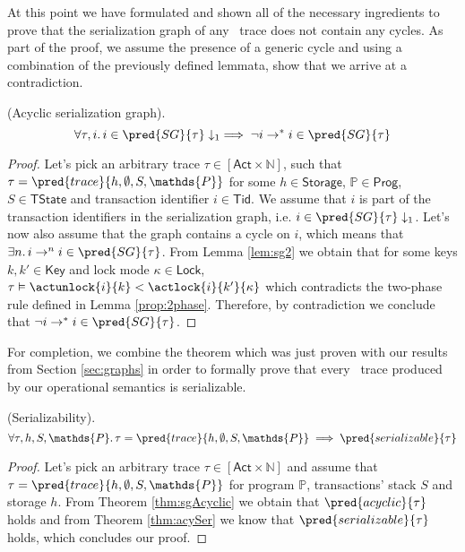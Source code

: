 At this point we have formulated and shown all of the necessary ingredients to prove that the serialization graph of any \tpl\ trace does not contain any cycles. As part of the proof, we assume the presence of a generic cycle and using a combination of the previously defined lemmata, show that we arrive at a contradiction.
\begin{thm}
	\label{thm:sgAcyclic}
	(Acyclic serialization graph).
	\[
	\forall \tau, i \ldotp i \in \pred{SG}{\tau} \downarrow_1 \implies \lnot i \rightarrow^* i \in \pred{SG}{\tau}
	\]
	\begin{proof}
	Let's pick an arbitrary trace $\tau \in [\mathsf{Act} \times \mathds{N}]$, such that $\tau = \pred{trace}{h, \emptyset, S, \mathds{P}}$ for some $h \in \mathsf{Storage}$, $\mathds{P} \in \mathsf{Prog}$, $S \in \mathsf{TState}$ and transaction identifier $i \in \mathsf{Tid}$. We assume that $i$ is part of the transaction identifiers in the serialization graph, i.e. $i \in \pred{SG}{\tau} \downarrow_1$. Let's now also assume that the graph contains a cycle on $i$, which means that $\exists n \ldotp i \rightarrow^n i \in \pred{SG}{\tau}$. From Lemma \ref{lem:sg2} we obtain that for some keys $k, k' \in \mathsf{Key}$ and lock mode $\kappa \in \mathsf{Lock}$, $\tau \vDash \actunlock{i}{k} < \actlock{i}{k'}{\kappa}$ which contradicts the two-phase rule defined in Lemma \ref{prop:2phase}. Therefore, by contradiction we conclude that $\lnot i \rightarrow^* i \in \pred{SG}{\tau}$.
	\end{proof}
\end{thm}

For completion, we combine the theorem which was just proven with our results from Section \ref{sec:graphs} in order to formally prove that every \tpl\ trace produced by our operational semantics is serializable.
\begin{thm}
	(Serializability).
	\[
		\forall \tau, h, S, \mathds{P} \ldotp \tau = \pred{trace}{h, \emptyset, S, \mathds{P}} \implies \pred{serializable}{\tau}
	\]
	\begin{proof}
	Let's pick an arbitrary trace $\tau \in [\mathsf{Act} \times \mathds{N}]$ and assume that $\tau = \pred{trace}{h, \emptyset, S, \mathds{P}}$ for program $\mathds{P}$, transactions' stack $S$ and storage $h$. From Theorem \ref{thm:sgAcyclic} we obtain that $\pred{acyclic}{\tau}$ holds and from Theorem \ref{thm:acySer} we know that $\pred{serializable}{\tau}$ holds, which concludes our proof.
	\end{proof}
\end{thm}